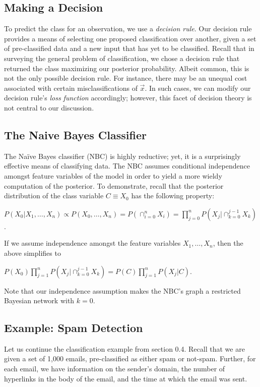 \documentclass[12pt,twoside]{reedthesis}
\begin{document}
		\subsection*{Making a Decision}
	
	To predict the class for an observation, we use a {\em decision rule}.
	Our decision rule provides a means of selecting one proposed classification over another, given a set of pre-classified data and a new input that has yet to be classified.
	Recall that in surveying the general problem of classification, we chose a decision rule that returned the class maximizing our posterior probability. 
	Albeit common, this is not the only possible decision rule. 
	For instance, there may be an unequal cost associated with certain misclassifications of $\vec{x}$. In such cases, we can modify our decision rule's {\em loss function} accordingly; however, this facet of decision theory is not central to our discussion.
	 
	\subsection*{The Naive Bayes Classifier} %
	The Na\"{i}ve Bayes classifier (NBC) is highly reductive; 
	yet, it is a surprisingly effective means of classifying data. 
	The NBC assumes conditional independence amongst feature variables of the model in order to yield a more wieldy computation of the posterior.
	To demonstrate, recall that the posterior distribution of the class variable $C \equiv X_0$ has the following property:
	\begin{center}
		$P(X_0 | X_1, \ldots , X_n) \propto
		P(X_0,\ldots,X_n) = 
		P( \displaystyle\cap_{i=0}^{n} X_i) = 
		\displaystyle\prod_{j=0}^{n} P(X_j | \displaystyle\cap_{k=0}^{j-1}X_k)$.
	\end{center}
	If we assume independence amongst the feature variables $X_1,\ldots,X_n$, then the above simplifies to
	\begin{center}
		$P(X_0) \displaystyle\prod_{j=1}^{n} P(X_j | \displaystyle\cap_{k=0}^{j-1}X_k)
		= P(C) \displaystyle\prod_{j=1}^{n} P(X_j | C)$.
	\end{center}
	Note that our independence assumption makes the NBC's graph a restricted Bayesian network with $k = 0$.
	\subsection*{Example: Spam Detection}
	Let us continue the classification example from section 0.4. Recall that we are given a set of 1,000 emails, pre-classified as either spam or not-spam. Further, for each email, we have information on the sender's domain, the number of hyperlinks in the body of the email, and the time at which the email was sent. 
	
\end{document}
